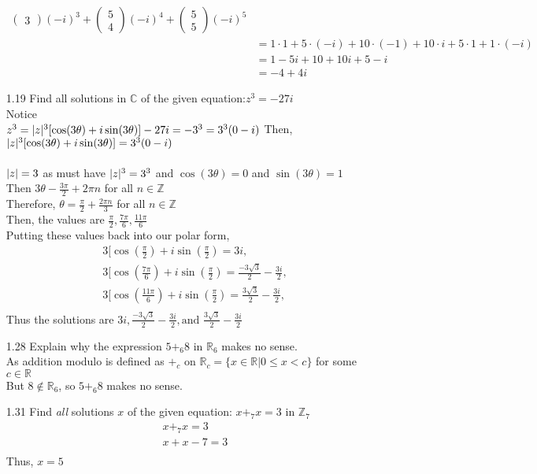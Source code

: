 \documentclass[12pt]{article}
\newcommand{\Z}{\mathds{Z}}
\newcommand{\C}{\mathbb{C}}
\newcommand{\R}{\mathbb{R}}
\DeclarePairedDelimiter\abs{\lvert}{\rvert}
\begin{document}
\begin{enumerate}
\begin{align*}
\begin{pmatrix}
				3
				\end{pmatrix} (-i)^3 + 
				\begin{pmatrix}
				5\\
				4
				\end{pmatrix} (-i)^4 + 
				\begin{pmatrix}
				5\\
				5
				\end{pmatrix} (-i)^5 \\
			&= 1\cdot 1 + 5 \cdot (-i) + 10 \cdot (-1)+10\cdot i + 5 \cdot 1 + 1 \cdot (-i)\\
			&= 1-5i+10+10i+5-i\\
			&= -4+4i		
		\end{align*}
	\item[1.19] Find all solutions in $\C$ of the given equation:\quad $z^3 = -27i$\\
		Notice \\
		$z^3 = \abs{z}^3[\cos(3\theta)+i\sin(3\theta)]\\
		-27i = -3^3 = 3^3(0-i) \\
		$
		Then,\\
		$\abs{z}^3[\cos(3\theta)+i\sin(3\theta)] = 3^3(0-i)$\\
		\\
		$\abs{z}=3$ as must have $\abs{z}^3 = 3^3$ and $\cos(3\theta)=0$ and $\sin(3\theta)=1$\\
		Then $3\theta - \frac{3\pi}{2}+2\pi n$ for all $n\in \Z$\\
		Therefore, $\theta = \frac{\pi}{2}+\frac{2\pi n}{3}$ for all $n \in \Z$\\
		Then, the values are $\frac{\pi}{2},\frac{7\pi}{6},\frac{11\pi}{6}$\\
		Putting these values back into our polar form,
		\begin{align*}
			3[\cos(\frac{\pi}{2})+i\sin(\frac{\pi}{2})=3i,\\
			3[\cos(\frac{7\pi}{6})+i\sin(\frac{\pi}{2})=\frac{-3\sqrt{3}}{2}-\frac{3i}{2},\\
			3[\cos(\frac{11\pi}{6})+i\sin(\frac{\pi}{2})=\frac{3\sqrt{3}}{2}-\frac{3i}{2},\\
		\end{align*}
		Thus the solutions are $3i,\frac{-3\sqrt{3}}{2}-\frac{3i}{2},\text{and }\frac{3\sqrt{3}}{2}-\frac{3i}{2}$
	\item[1.28] Explain why the expression $5+_6 8$ in $\R_6$ makes no sense.\\
	As addition modulo is defined as $+_c$ on $\R_c = \{x\in \R | 0 \leq x < c \}$ for some $c \in \R$\\
	But $8 \notin \R_6$, so $5+_6 8$ makes no sense. 
	\item[1.31] Find \textit{all} solutions $x$ of the given equation: \quad $x+_7x=3$ in $\Z_7$\\
		\begin{align*}
			x+_7x=3\\
			x+x-7=3\\
		\end{align*}
		Thus, $x=5$
	

\end{enumerate}
\end{document}
